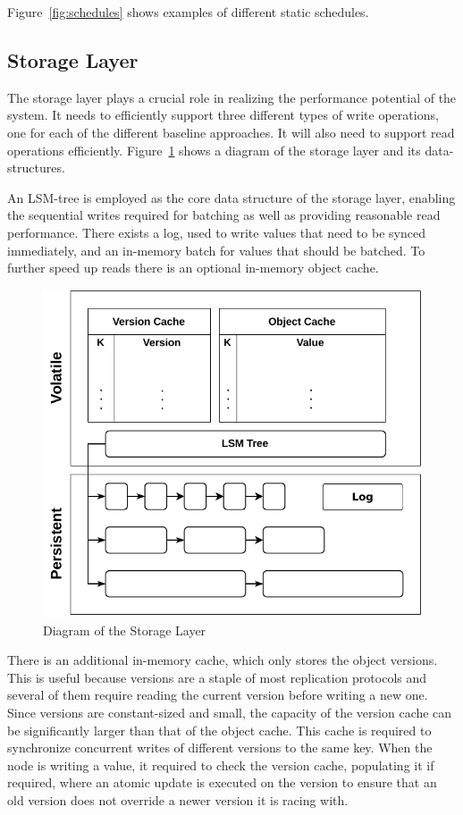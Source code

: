 Figure~\ref{fig:schedules} shows examples of different static
schedules.

\subsection{Storage Layer}\label{ssec:storage}

The storage layer plays a crucial role in realizing the
performance potential of the system. It needs to efficiently support
three different types of write operations, one for each of the
different baseline approaches. It will also need to support read operations
efficiently. Figure~\ref{fig:storage_layer} shows a diagram of
the storage layer and its data-structures.

An \ac{LSM-tree} is employed as the core data structure of the storage
layer, enabling the sequential writes required for batching as
well as providing reasonable read performance. There exists a
log, used to write values that need to be synced immediately, and
an in-memory batch for values that should be batched. To further speed
up reads there is an optional in-memory object cache.

\begin{figure}[t]
    \centering
    \includegraphics[width=.75\linewidth]{img/storage_layer}
    \caption{Diagram of the Storage Layer}\label{fig:storage_layer}
\end{figure}


There is an additional in-memory cache, which only stores the
object versions. This is useful because versions are a staple of
most replication protocols and several of them require reading
the current version before writing a new one. Since versions are
constant-sized and small, the capacity of the version cache can
be significantly larger than that of the object cache. This cache
is required to synchronize concurrent writes of different
versions to the same key. When the node is writing a value, it required to
check the version cache, populating it if required, where an
atomic update is executed on the version to ensure that an old
version does not override a newer version it is racing with.

